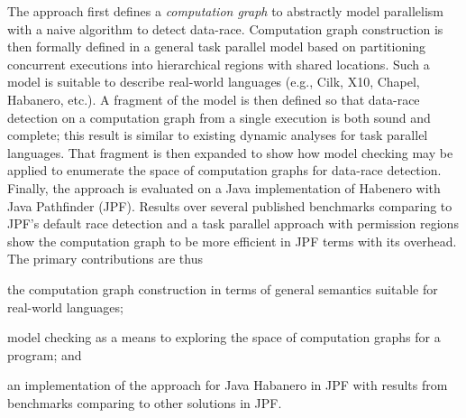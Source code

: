 The approach first defines a \emph{computation graph} to abstractly model parallelism with a naive algorithm to detect data-race. Computation graph construction is then formally defined in a general task parallel model based on partitioning concurrent executions into hierarchical regions with shared locations. Such a model is suitable to describe real-world languages (e.g., Cilk, X10, Chapel, Habanero, etc.).  A fragment of the model is then defined so that data-race detection on a computation graph from a single execution is both sound and complete; this result is similar to existing dynamic analyses for task parallel languages. That fragment is then expanded to show how model checking may be applied to enumerate the space of computation graphs for data-race detection. Finally, the approach is evaluated on a Java implementation of Habenero with Java Pathfinder (JPF). Results over several published benchmarks comparing to JPF's default race detection and a task parallel approach with permission regions show the computation graph to be more efficient in JPF terms with its overhead. The primary contributions are thus
\begin{compactitem}
\item the computation graph construction in terms of general semantics suitable for real-world languages;
\item model checking as a means to exploring the space of computation graphs for a program; and
\item an implementation of the approach for Java Habanero in JPF with results from benchmarks comparing to other solutions in JPF. 
\end{compactitem}
\begin{comment}
Section \ref{sec:drd} defines computation graphs and data-race detection given a computation graph. Section \ref{sec:cg} is the programming model with graph construction. Section \ref{sec:otf-drd} is the model checking algorithm. Section \ref{sec:impl} gives an implementation of the algorithm for Habanero and section \ref{sec:res} discusses the results. Section \ref{sec:rel-work} discusses related work. Section \ref{sec:conclusion} presents the conclusion.
\end{comment}
